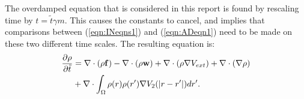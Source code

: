The overdamped equation that is considered in this report is found by rescaling time by $t = \tilde t \gamma m$. This causes the constants to cancel, and implies that comparisons between (\ref{eqn:INeqns1}) and (\ref{eqn:ADeqn1}) need to be made on these two different time scales.
The resulting equation is:
\begin{align}
	\label{eqn:ADeqn1}
	\frac{\partial \rho}{\partial \tilde t} &= \nabla \cdot (\rho \mathbf{f}) - \nabla \cdot (\rho \mathbf{w})  + \nabla \cdot (\rho\nabla V_{ext}) + \nabla \cdot (\nabla \rho) \\
	&+\nabla \cdot \int_\Omega \rho(r)\rho(r') \nabla V_2(|r-r'|)dr'. \notag
\end{align}

